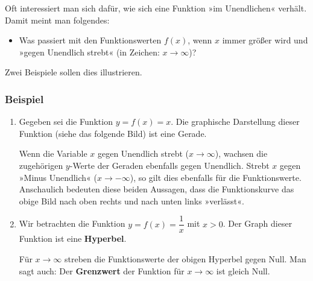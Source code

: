 Oft interessiert man sich dafür, wie sich eine Funktion »im Unendlichen« verhält. Damit meint man folgendes:
\begin{itemize}
  \item Was passiert mit den Funktionswerten $f(x)$, wenn $x$ immer größer wird und »gegen Unendlich strebt« (in Zeichen: $x \rightarrow \infty$)?
\end{itemize}

Zwei Beispiele sollen dies illustrieren.

\subsubsection{Beispiel}

\begin{enumerate}[label=\alph*)]
  \item Gegeben sei die Funktion $y = f(x) = x$. Die graphische Darstellung dieser Funktion (siehe das folgende Bild) ist eine Gerade.

  \begin{center}
  \end{center}

  Wenn die Variable $x$ gegen Unendlich strebt ($x \rightarrow \infty$), wachsen die zugehörigen $y$-Werte der Geraden ebenfalls gegen Unendlich. Strebt $x$ gegen »Minus Unendlich« ($x \rightarrow -\infty$), so gilt dies ebenfalls für die Funktionswerte. Anschaulich bedeuten diese beiden Aussagen, dass die Funktionskurve das obige Bild nach oben rechts und nach unten links »verlässt«.

  \item Wir betrachten die Funktion $y = f(x) = \dfrac{1}{x}$ mit $x > 0$. Der Graph dieser Funktion ist eine \textbf{Hyperbel}.

  \begin{center}
  \end{center}\beispielende

  Für $x \rightarrow \infty$ streben die Funktionswerte der obigen Hyperbel gegen Null. Man sagt auch: Der \textbf{Grenzwert} der Funktion für $x \rightarrow \infty$ ist gleich Null.
\end{enumerate}

